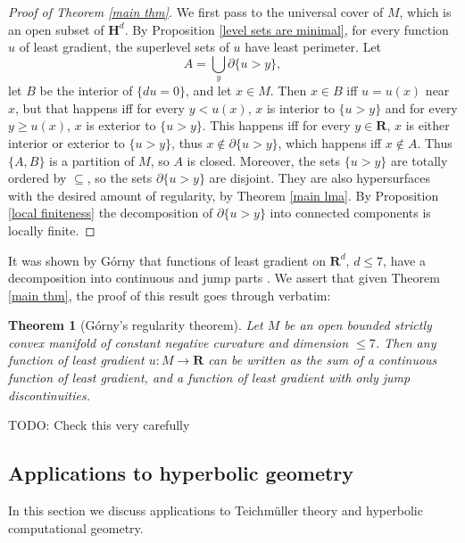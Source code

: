 \documentclass[reqno,12pt,letterpaper]{amsart}
\newcommand{\RR}{\mathbf{R}}
\newcommand{\Hyp}{\mathbf H}
\newtheorem{theorem}{Theorem}[section]
\theoremstyle{definition}
\numberwithin{equation}{section}
\begin{document}
\begin{proof}[Proof of Theorem \ref{main thm}]
We first pass to the universal cover of $M$, which is an open subset of $\Hyp^d$.
By Proposition \ref{level sets are minimal}, for every function $u$ of least gradient, the superlevel sets of $u$ have least perimeter.
Let
\begin{equation}\label{lamination union}
A = \bigcup_y \partial \{u > y\},
\end{equation}
let $B$ be the interior of $\{du = 0\}$, and let $x \in M$.
Then $x \in B$ iff $u = u(x)$ near $x$, but that happens iff for every $y < u(x)$, $x$ is interior to $\{u > y\}$ and for every $y \geq u(x)$, $x$ is exterior to $\{u > y\}$.
This happens iff for every $y \in \RR$, $x$ is either interior or exterior to $\{u > y\}$, thus $x \notin \partial \{u > y\}$, which happens iff $x \notin A$.
Thus $\{A, B\}$ is a partition of $M$, so $A$ is closed.
Moreover, the sets $\{u > y\}$ are totally ordered by $\subseteq$, so the sets $\partial \{u > y\}$ are disjoint.
They are also hypersurfaces with the desired amount of regularity, by Theorem \ref{main lma}.
By Proposition \ref{local finiteness} the decomposition of $\partial \{u > y\}$ into connected components is locally finite.
\end{proof}

It was shown by G\'orny that functions of least gradient on $\RR^d$, $d \leq 7$, have a decomposition into continuous and jump parts \cite[Theorem 1.2]{górny2017planar}.
We assert that given Theorem \ref{main thm}, the proof of this result goes through verbatim:

\begin{theorem}[G\'orny's regularity theorem]\label{Gorny regularity}
Let $M$ be an open bounded strictly convex manifold of constant negative curvature and dimension $\leq 7$.
Then any function of least gradient $u: M \to \RR$ can be written as the sum of a continuous function of least gradient, and a function of least gradient with only jump discontinuities.
\end{theorem}

TODO: Check this very carefully


\subsection{Applications to hyperbolic geometry}
In this section we discuss applications to Teichm\"uller theory and hyperbolic computational geometry.
\end{document}
